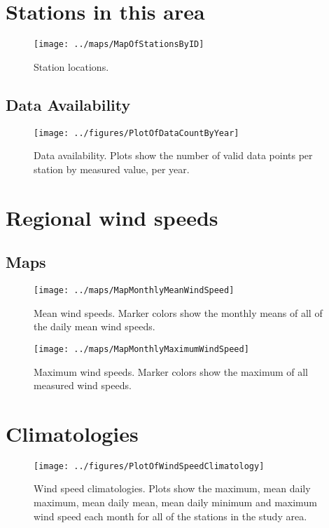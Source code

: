 \documentclass[report]{nrel}
\begin{document}
\tableofcontents

\chapter{Stations in this area}



\begin{figure}[!ht]
\centering
\texttt{[image: ../maps/MapOfStationsByID]}
\caption{Station locations.}
\end{figure}

\section{Data Availability}

\begin{figure}[!ht]
\centering
\texttt{[image: ../figures/PlotOfDataCountByYear]}
\caption{Data availability. Plots show the number of valid data points per station by measured value, per year.}
\end{figure}

\chapter{Regional wind speeds}
\section{Maps}

\begin{figure}[!ht]
\centering
\texttt{[image: ../maps/MapMonthlyMeanWindSpeed]}
\caption{Mean wind speeds. Marker colors show the monthly means of all of the daily mean wind speeds.}
\end{figure}

\begin{figure}[!ht]
\centering
\texttt{[image: ../maps/MapMonthlyMaximumWindSpeed]}
\caption{Maximum wind speeds. Marker colors show the maximum of all measured wind speeds.}
\end{figure}

\chapter{Climatologies}
\begin{figure}[!ht]
\centering
\texttt{[image: ../figures/PlotOfWindSpeedClimatology]}
\caption{Wind speed climatologies. Plots show the maximum, mean daily maximum, mean daily mean, mean daily minimum and maximum wind speed each month for all of the stations in the study area.}
\end{figure}
\end{document}
